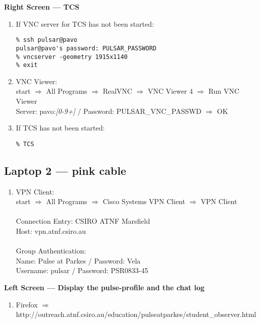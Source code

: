 \documentclass{article}
\begin{document}
\textbf{Right Screen --- TCS}
\begin{enumerate}
\item If VNC server for TCS has not been started:
\begin{verbatim}
% ssh pulsar@pavo
pulsar@pavo's password: PULSAR_PASSWORD
% vncserver -geometry 1915x1140
% exit
\end{verbatim}

\item VNC Viewer: \\
start $\Rightarrow$ All Programs $\Rightarrow$ RealVNC $\Rightarrow$ VNC Viewer 4 $\Rightarrow$ Run VNC Viewer \\
Server: pavo:\emph{[0-9+]} / Password: PULSAR\_VNC\_PASSWD $\Rightarrow$ OK

\item If TCS has not been started:
\begin{verbatim}
% TCS 
\end{verbatim}

\end{enumerate}

\subsection*{Laptop 2 --- pink cable}

\begin{enumerate}
\item VPN Client: \\
start $\Rightarrow$ All Programs $\Rightarrow$ Cisco Systems VPN Client $\Rightarrow$ VPN Client \\ \\
Connection Entry: CSIRO ATNF Marsfield \\
Host: vpn.atnf.csiro.au \\
\\
Group Authentication: \\

Name: Pulse at Parkes / Password: Vela \\

Username: pulsar / Password: PSR0833-45

\end{enumerate}


\textbf{Left Screen --- Display the pulse-profile and the chat log}
\begin{enumerate}
\item Firefox $\Rightarrow$ http://outreach.atnf.csiro.au/education/pulseatparkes/student\_observer.html
\end{enumerate}
\end{document}

